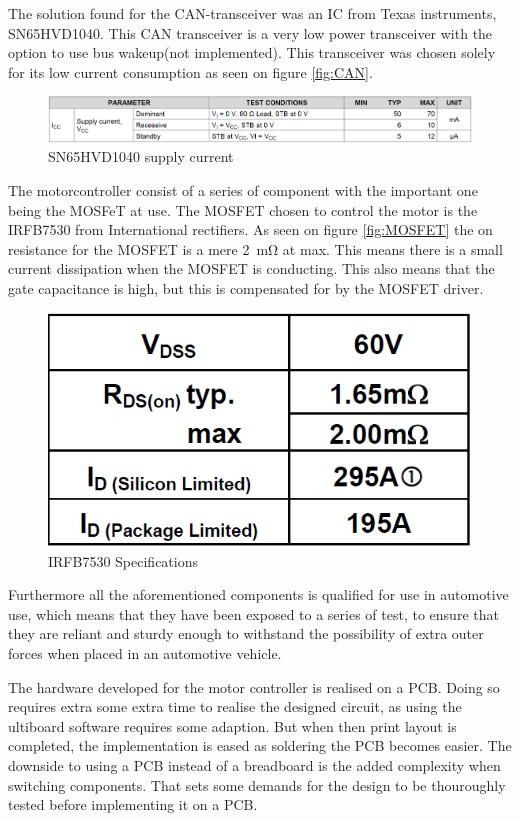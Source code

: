 The solution found for the CAN-transceiver was an IC from Texas instruments, SN65HVD1040\cite{CAN}. This CAN transceiver is a very low power transceiver with the option to use bus wakeup(not implemented). This transceiver was chosen solely for its low current consumption as seen on figure \vref{fig:CAN}. 

\begin{figure}[H]
	\centering
	\includegraphics[width=1\linewidth]{Hardware/Pictures/CAN}
	\caption{SN65HVD1040 supply current}
	\label{fig:CAN}
\end{figure}

The motorcontroller consist of a series of component with the important one being the MOSFeT at use. The MOSFET chosen to control the motor is the IRFB7530\cite{IRFB7530} from International rectifiers. As seen on figure \vref{fig:MOSFET} the on resistance for the MOSFET is a mere \SI{2}{\milli \ohm} at max. This means there is a small current dissipation when the MOSFET is conducting. This also means that the gate capacitance is high, but this is compensated for by the MOSFET driver.  

\begin{figure}[H]
	\centering
	\includegraphics[width=0.5\linewidth]{Hardware/Pictures/IRFB7530}
	\caption{IRFB7530 Specifications}
	\label{fig:MOSFET}
\end{figure}

Furthermore all the aforementioned components is qualified for use in automotive use, which means that they have been exposed to a series of test, to ensure that they are reliant and sturdy enough to withstand the possibility of extra outer forces when placed in an automotive vehicle. 

The hardware developed for the motor controller is realised on a PCB. Doing so requires extra some extra time to realise the designed circuit, as using the ultiboard software requires some adaption. But when then print layout is completed, the implementation is eased as soldering the PCB becomes easier. The downside to using a PCB instead of a breadboard is the added complexity when switching components. That sets some demands for the design to be thouroughly tested before implementing it on a PCB.

